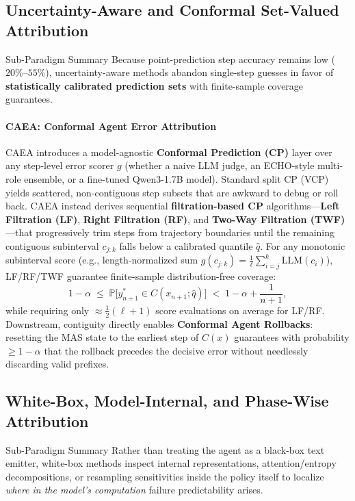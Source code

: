 \subsection{Uncertainty-Aware and Conformal Set-Valued Attribution}\label{sec:conformal}
\begin{summarybox}[s6]{Sub-Paradigm Summary \hfill \cpbadge}
Because point-prediction step accuracy remains low ($20\%$--$55\%$), uncertainty-aware methods abandon single-step guesses in favor of \textbf{statistically calibrated prediction sets} with finite-sample coverage guarantees.
\end{summarybox}

\paragraph{CAEA: Conformal Agent Error Attribution~\citep{feng2026caea}}
CAEA introduces a model-agnostic \textbf{Conformal Prediction (CP)} layer over any step-level error scorer $g$ (whether a naive LLM judge, an ECHO-style multi-role ensemble, or a fine-tuned Qwen3-1.7B model). Standard split CP (VCP) yields scattered, non-contiguous step subsets that are awkward to debug or roll back. CAEA instead derives sequential \textbf{filtration-based CP} algorithms---\textbf{Left Filtration (LF)}, \textbf{Right Filtration (RF)}, and \textbf{Two-Way Filtration (TWF)}---that progressively trim steps from trajectory boundaries until the remaining contiguous subinterval $c_{j:k}$ falls below a calibrated quantile $\hat{q}$. For any monotonic subinterval score (e.g., length-normalized sum $g(c_{j:k}) = \frac{1}{\ell}\sum_{i=j}^k \text{LLM}(c_i)$), LF/RF/TWF guarantee finite-sample distribution-free coverage:
\begin{equation}
  1 - \alpha \;\le\; \mathbb{P}\!\big[y^*_{n+1} \in C(x_{n+1}; \hat{q})\big] \;<\; 1 - \alpha + \frac{1}{n+1},
\end{equation}
while requiring only $\approx \frac{1}{2}(\ell+1)$ score evaluations on average for LF/RF. Downstream, contiguity directly enables \textbf{Conformal Agent Rollbacks}: resetting the MAS state to the earliest step of $C(x)$ guarantees with probability $\ge 1-\alpha$ that the rollback precedes the decisive error without needlessly discarding valid prefixes.

\subsection{White-Box, Model-Internal, and Phase-Wise Attribution}\label{sec:whitebox}
\begin{summarybox}[s7]{Sub-Paradigm Summary \hfill \whiteboxbadge}
Rather than treating the agent as a black-box text emitter, white-box methods inspect internal representations, attention/entropy decompositions, or resampling sensitivities inside the policy itself to localize \emph{where in the model's computation} failure predictability arises.
\end{summarybox}

